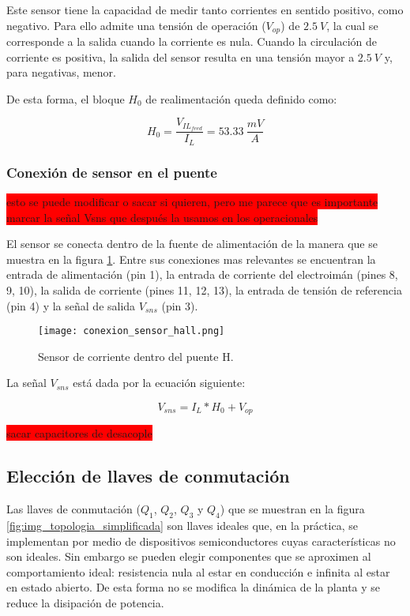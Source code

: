 Este sensor tiene la capacidad de medir tanto corrientes en sentido positivo, como negativo. Para ello admite una tensión de operación ($V_{op}$) de $2.5\:V$, la cual se corresponde a la salida cuando la corriente es nula. Cuando la circulación de corriente es positiva, la salida del sensor resulta en una tensión mayor a $2.5\:V$ y, para negativas, menor.

De esta forma, el bloque $H_0$ de realimentación queda definido como:

\begin{equation}
	H_0=\frac{V_{IL_{feed}}}{I_L}=53.33 \:\frac{mV}{A}
\end{equation}

\subsubsection{Conexión de sensor en el puente}
\colorbox{red}{esto se puede modificar o sacar si quieren, pero me parece que es importante marcar la señal Vsns que después la usamos en los operacionales}

El sensor se conecta dentro de la fuente de alimentación de la manera que se muestra en la figura \ref{fig:img_conexion_sensor}. Entre sus conexiones mas relevantes se encuentran la entrada de alimentación (pin 1), la entrada de corriente del electroimán (pines 8, 9, 10), la salida de corriente (pines 11, 12, 13), la entrada de tensión de referencia (pin 4) y la señal de salida $V_{sns}$ (pin 3).

\begin{figure}[H]
	\centering
	\texttt{[image: conexion\_sensor\_hall.png]}
	\caption{Sensor de corriente dentro del puente H.}
	\label{fig:img_conexion_sensor}
\end{figure}

La señal $V_{sns}$ está dada por la ecuación siguiente:

\begin{equation}
	V_{sns}=I_L*H_0+V_{op}
\end{equation}

\colorbox{red}{sacar capacitores de desacople}

\subsection{Elección de llaves de conmutación} \label{sec_eleccion_llaves}

Las llaves de conmutación ($Q_1$, $Q_2$, $Q_3$ y $Q_4$) que se muestran en la figura \ref{fig:img_topologia_simplificada} son llaves ideales que, en la práctica, se implementan por medio de dispositivos semiconductores cuyas características no son ideales. Sin embargo se pueden elegir componentes que se aproximen al comportamiento ideal: resistencia nula al estar en conducción e infinita al estar en estado abierto. De esta forma no se modifica la dinámica de la planta y se reduce la disipación de potencia.

